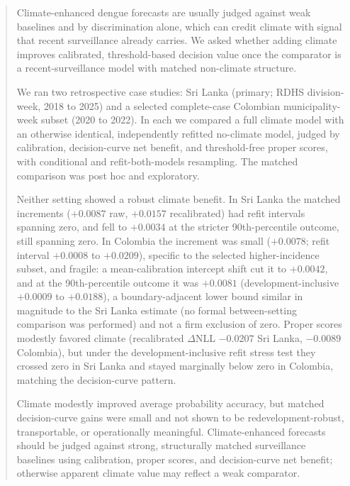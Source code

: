 \documentclass[11pt,a4paper]{article}
\begin{document}
\begin{abstract}
\noindent Climate-enhanced dengue forecasts are usually judged against weak baselines and by discrimination alone, which can credit climate with signal that recent surveillance already carries. We asked whether adding climate improves calibrated, threshold-based decision value once the comparator is a recent-surveillance model with matched non-climate structure.

\noindent We ran two retrospective case studies: Sri Lanka (primary; RDHS division-week, 2018 to 2025) and a selected complete-case Colombian municipality-week subset (2020 to 2022). In each we compared a full climate model with an otherwise identical, independently refitted no-climate model, judged by calibration, decision-curve net benefit, and threshold-free proper scores, with conditional and refit-both-models resampling. The matched comparison was post hoc and exploratory.

\noindent Neither setting showed a robust climate benefit. In Sri Lanka the matched increments ($+0.0087$ raw, $+0.0157$ recalibrated) had refit intervals spanning zero, and fell to $+0.0034$ at the stricter 90th-percentile outcome, still spanning zero. In Colombia the increment was small ($+0.0078$; refit interval $+0.0008$ to $+0.0209$), specific to the selected higher-incidence subset, and fragile: a mean-calibration intercept shift cut it to $+0.0042$, and at the 90th-percentile outcome it was $+0.0081$ (development-inclusive $+0.0009$ to $+0.0188$), a boundary-adjacent lower bound similar in magnitude to the Sri Lanka estimate (no formal between-setting comparison was performed) and not a firm exclusion of zero. Proper scores modestly favored climate (recalibrated $\Delta$NLL $-0.0207$ Sri Lanka, $-0.0089$ Colombia), but under the development-inclusive refit stress test they crossed zero in Sri Lanka and stayed marginally below zero in Colombia, matching the decision-curve pattern.

\noindent Climate modestly improved average probability accuracy, but matched decision-curve gains were small and not shown to be redevelopment-robust, transportable, or operationally meaningful. Climate-enhanced forecasts should be judged against strong, structurally matched surveillance baselines using calibration, proper scores, and decision-curve net benefit; otherwise apparent climate value may reflect a weak comparator.
\end{abstract}
\end{document}
